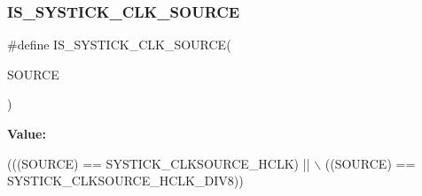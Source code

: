 \subsubsection{\texorpdfstring{I\+S\+\_\+\+S\+Y\+S\+T\+I\+C\+K\+\_\+\+C\+L\+K\+\_\+\+S\+O\+U\+R\+CE}{IS\_SYSTICK\_CLK\_SOURCE}}
{\footnotesize\ttfamily \#define I\+S\+\_\+\+S\+Y\+S\+T\+I\+C\+K\+\_\+\+C\+L\+K\+\_\+\+S\+O\+U\+R\+CE(\begin{DoxyParamCaption}\item[{}]{S\+O\+U\+R\+CE }\end{DoxyParamCaption})}

{\bfseries Value\+:}
\begin{DoxyCode}
(((SOURCE) == SYSTICK\_CLKSOURCE\_HCLK) || \(\backslash\)
                                      ((SOURCE) == SYSTICK\_CLKSOURCE\_HCLK\_DIV8))
\end{DoxyCode}
